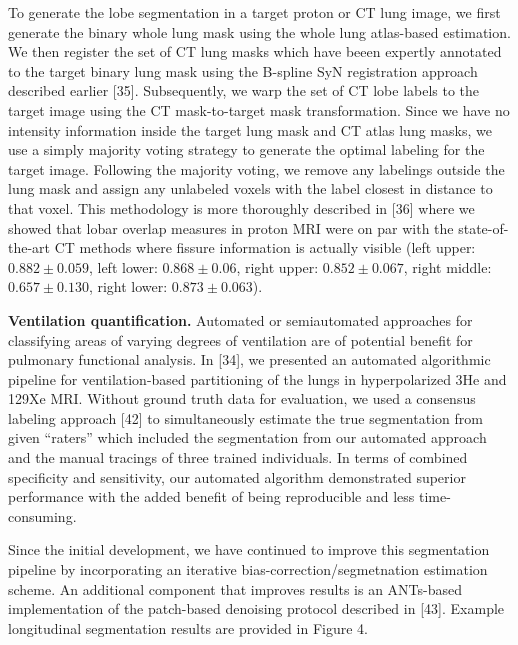 \documentclass[11pt,]{article}
\begin{document}
To generate the lobe segmentation in a target proton or CT lung image,
we first generate the binary whole lung mask using the whole lung
atlas-based estimation. We then register the set of CT lung masks which
have beeen expertly annotated to the target binary lung mask using the
B-spline SyN registration approach described earlier {[}35{]}.
Subsequently, we warp the set of CT lobe labels to the target image
using the CT mask-to-target mask transformation. Since we have no
intensity information inside the target lung mask and CT atlas lung
masks, we use a simply majority voting strategy to generate the optimal
labeling for the target image. Following the majority voting, we remove
any labelings outside the lung mask and assign any unlabeled voxels with
the label closest in distance to that voxel. This methodology is more
thoroughly described in {[}36{]} where we showed that lobar overlap
measures in proton MRI were on par with the state-of-the-art CT methods
where fissure information is actually visible (left upper:
$0.882 \pm 0.059$, left lower: $0.868 \pm 0.06$, right upper:
$0.852 \pm 0.067$, right middle: $0.657 \pm 0.130$, right lower:
$0.873 \pm 0.063$).

\textbf{Ventilation quantification.} Automated or semiautomated
approaches for classifying areas of varying degrees of ventilation are
of potential benefit for pulmonary functional analysis. In {[}34{]}, we
presented an automated algorithmic pipeline for ventilation-based
partitioning of the lungs in hyperpolarized 3He and 129Xe MRI. Without
ground truth data for evaluation, we used a consensus labeling approach
{[}42{]} to simultaneously estimate the true segmentation from given
``raters'' which included the segmentation from our automated approach
and the manual tracings of three trained individuals. In terms of
combined specificity and sensitivity, our automated algorithm
demonstrated superior performance with the added benefit of being
reproducible and less time-consuming.

Since the initial development, we have continued to improve this
segmentation pipeline by incorporating an iterative
bias-correction/segmetnation estimation scheme. An additional component
that improves results is an ANTs-based implementation of the patch-based
denoising protocol described in {[}43{]}. Example longitudinal
segmentation results are provided in Figure 4.
\end{document}
